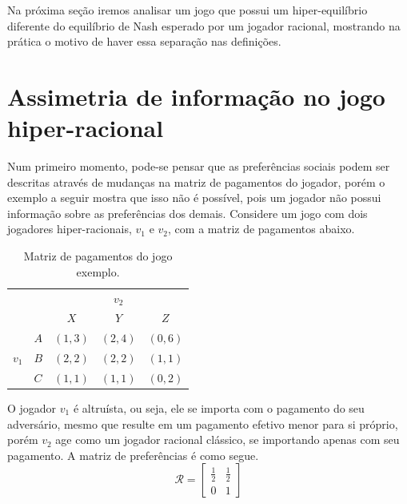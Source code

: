 Na próxima seção iremos analisar um jogo que possui um hiper-equilíbrio diferente do equilíbrio de Nash esperado por um jogador racional, mostrando na prática o motivo de haver essa separação nas definições.


\section{Assimetria de informação no jogo hiper-racional}

Num primeiro momento, pode-se pensar que as preferências sociais podem ser descritas através de mudanças na matriz de pagamentos do jogador, porém o exemplo a seguir mostra que isso não é possível, pois um jogador não possui informação sobre as preferências dos demais. Considere um jogo com dois jogadores hiper-racionais, $v_1$ e $v_2$, com a matriz de pagamentos abaixo.
\begin{table}[h]
\begin{center}
    \begin{tabular}{ccccc}
        & & \multicolumn{3}{c}{$v_2$} \\
        & & $X$ & $Y$ & $Z$ \\ \cline{3-5} 
        \multirow{3}{*}{$v_1$} & \multicolumn{1}{c|}{$A$} & \multicolumn{1}{l|}{$(1,3)$} & \multicolumn{1}{l|}{$(2,4)$} & \multicolumn{1}{l|}{$(0,6)$} \\ \cline{3-5} 
        & \multicolumn{1}{c|}{$B$} & \multicolumn{1}{l|}{$(2,2)$}  & \multicolumn{1}{l|}{$(2,2)$} & \multicolumn{1}{l|}{$(1,1)$}  \\ \cline{3-5} 
        & \multicolumn{1}{l|}{$C$} & \multicolumn{1}{l|}{$(1,1)$}  & \multicolumn{1}{l|}{$(1,1)$} & \multicolumn{1}{l|}{$(0,2)$} \\ \cline{3-5} 
    \end{tabular}
    \caption{Matriz de pagamentos do jogo exemplo.}
    \label{JogoHRassimetrico}
\end{center}
\end{table}

O jogador $v_1$ é altruísta, ou seja, ele se importa com o pagamento do seu adversário, mesmo que resulte em um pagamento efetivo menor para si próprio, porém $v_2$ age como um jogador racional clássico, se importando apenas com seu pagamento. A matriz de preferências é como segue.
\begin{equation}
    \label{matrizPrefAssimetrico}
    \mathcal{R}=
    \begin{bmatrix}
        \frac{1}{2} & \frac{1}{2}\\ 
        0 & 1 
    \end{bmatrix}
\end{equation}

